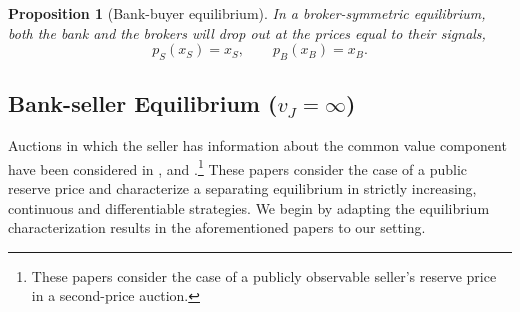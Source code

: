 \documentclass[11pt,twopage]{article}
\newtheorem{proposition}{Proposition}
{\bf}{\it}
\begin{document}
\begin{proposition}[Bank-buyer equilibrium] 
  In a broker-symmetric equilibrium, both the bank and the brokers
  will drop out at the prices equal to their signals, \[ p_S(x_S) =
  x_S, \quad \quad p_B(x_B) = x_B. \]
\end{proposition}

\subsection{Bank-seller Equilibrium ($v_J = \infty$)}

\label{sec:comm-value-comp}




%
%
% 
%
Auctions in which the seller has information about the common value
component have been considered in \cite{jullien2006auction},
\cite{cai2007reserve} and \cite{lamy}.\footnote{These papers consider
  the case of a publicly observable seller's reserve price in a
  second-price auction.}  These papers consider the case of a public
reserve price and characterize a separating equilibrium in strictly
increasing, continuous and differentiable strategies.
We begin by adapting the equilibrium characterization results in the
aforementioned papers to our setting.
\end{document}
